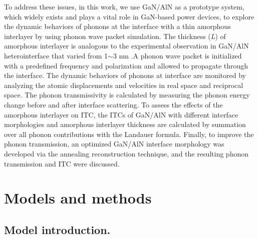 \documentclass{article}
\begin{document}
           To address these issues, in this work, we use GaN/AlN as a prototype system, which widely exists and plays a vital role in GaN-based power devices, to explore the dynamic behaviors of phonons at the interface with a thin amorphous interlayer by using phonon wave packet simulation. The thickness (\textit{L}) of amorphous interlayer is analogous to the experimental observation in GaN/AlN heterointerface that varied from 1$\sim$3 nm  \cite{spindlberger2021cross} \cite{zheng2019study}.A phonon wave packet is initialized with a predefined frequency and polarization and allowed to propagate through the interface. The dynamic behaviors of phonons at interface are monitored by analyzing the atomic displacements and velocities in real space and reciprocal space. The phonon transmissivity is calculated by measuring the phonon energy change before and after interface scattering. To  assess the effects of the amorphous interlayer on ITC, the ITCs of GaN/AlN with different interface morphologies and amorphous interlayer thickness are calculated by summation over all phonon contributions with the Landauer formula. Finally, to improve the phonon transmission, an optimized GaN/AlN interface morphology was developed via the annealing reconstruction technique, and the resulting phonon transmission and ITC were discussed. 

\section{Models and methods}

\subsection{Model introduction.}
\end{document}
